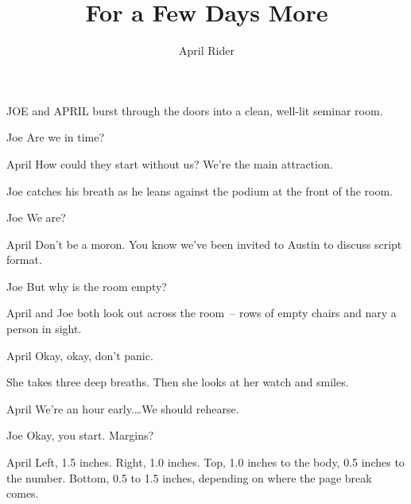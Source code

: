 \documentclass{screenplay}[2012/06/30]
\title{For a Few Days More}
\author{April Rider}
\begin{document}
\coverpage
\fadein
{}

JOE and APRIL burst through the doors into a clean, well-lit seminar room.

\begin{dialogue}{Joe}
    Are we in time?
\end{dialogue}

\begin{dialogue}{April}
    How could they start without us?
    We're the main attraction.
\end{dialogue}

Joe catches his breath as he leans against the podium at the front of the room.

\begin{dialogue}{Joe}
    We are?
\end{dialogue}

\begin{dialogue}{April}
    Don't be a moron.  You know we've
    been invited to Austin to discuss
    script format.
\end{dialogue}

\begin{dialogue}{Joe}
    But why is the room empty?
\end{dialogue}

April and Joe both look out across the room~-- rows of empty chairs and nary a person in sight.

\begin{dialogue}{April}
    Okay, okay, don't panic.
\end{dialogue}

She takes three deep breaths.  Then she looks at her watch
and smiles.

\begin{dialogue}[continuing]{April}
    We're an hour early.\dots  We should
    rehearse.
\end{dialogue}

\begin{dialogue}{Joe}
    Okay, you start.  Margins?
\end{dialogue}

\begin{dialogue}{April}
    Left, 1.5 inches.  Right, 1.0
    inches.  Top, 1.0 inches to the
    body, 0.5 inches to the number.
    Bottom, 0.5 to 1.5 inches,
    depending on where the page break
    comes.
\end{dialogue}
\end{document}
